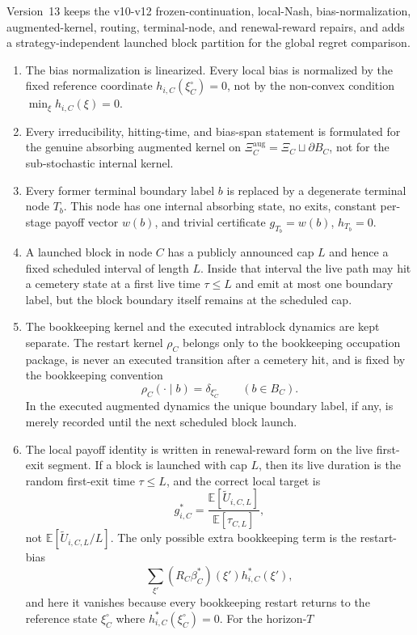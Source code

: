 \documentclass[12pt]{article}
\theoremstyle{definition}
\newcommand{\E}{\mathbb{E}}
\newcommand{\1}{\mathbf{1}}
\begin{document}
Version~13 keeps the v10-v12 frozen-continuation, local-Nash,
bias-normalization, augmented-kernel, routing, terminal-node, and
renewal-reward repairs, and adds a strategy-independent launched block
partition for the global regret comparison.

\begin{enumerate}[label=\textnormal{(\arabic*)},leftmargin=2.4em]
\item The bias normalization is linearized. Every local bias is normalized by the
fixed reference coordinate $h_{i,C}(\xi_C^\circ)=0$, not by the non-convex
condition $\min_\xi h_{i,C}(\xi)=0$.
\item Every irreducibility, hitting-time, and bias-span statement is formulated
for the genuine absorbing augmented kernel on
$\Xi_C^{\mathrm{aug}}=\Xi_C\sqcup\partial B_C$, not for the sub-stochastic
internal kernel.
\item Every former terminal boundary label $b$ is replaced by a degenerate
terminal node $T_b$. This node has one internal absorbing state, no exits,
constant per-stage payoff vector $w(b)$, and trivial certificate
$g_{T_b}=w(b)$, $h_{T_b}=0$.
\item A launched block in node $C$ has a publicly announced cap $L$ and hence a
fixed scheduled interval of length $L$. Inside that interval the live path may
hit a cemetery state at a first live time $\tau\le L$ and emit at most one
boundary label, but the block boundary itself remains at the scheduled cap.
\item The bookkeeping kernel and the executed intrablock dynamics are kept
separate. The restart kernel $\rho_C$ belongs only to the bookkeeping occupation
package, is never an executed transition after a cemetery hit, and is fixed by
the bookkeeping convention
\[
\rho_C(\cdot\mid b)=\delta_{\xi_C^\circ}
\qquad (b\in B_C).
\]
In the executed augmented dynamics the unique boundary label, if any, is merely
recorded until the next scheduled block launch.
\item The local payoff identity is written in renewal-reward form on the live
first-exit segment. If a block is launched with cap $L$, then its live duration
is the random first-exit time $\tau\le L$, and the correct local target is
\[
g_{i,C}^*
=
\frac{\E[\widetilde U_{i,C,L}]}{\E[\tau_{C,L}]},
\]
not $\E[\widetilde U_{i,C,L}/L]$. The only possible extra bookkeeping term is the
restart-bias
\[
\sum_{\xi'}(R_C\beta_C^*)(\xi')h_{i,C}^*(\xi'),
\]
and here it vanishes because every bookkeeping restart returns to the reference
state $\xi_C^\circ$ where $h_{i,C}^*(\xi_C^\circ)=0$. For the horizon-$T$

\end{enumerate}
\end{document}
